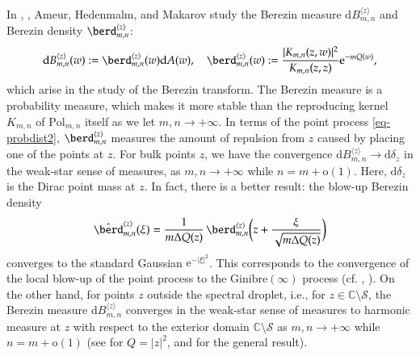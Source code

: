 \documentclass{birkart}
\theoremstyle{definition}
\theoremstyle{remark}
\numberwithin{equation}{section}
\numberwithin{figure}{section}
\newcommand{\e}{\mathrm e}
\newcommand{\1}{{\mathbf 1}}
\newcommand{\C}{{\mathbb C}}
\newcommand{\ordo}{\mathrm{o}}
\newcommand{\diff}{{\mathrm d}}
\begin{document}
In \cite{ahm1}, \cite{ahm2}, Ameur, Hedenmalm, and Makarov study 
the Berezin measure 
$\diff B_{m,n}^{\langle z\rangle}$ and Berezin density 
$\berd_{m,n}^{\langle z\rangle}$:
\[ 
\diff B_{m,n}^{\langle z\rangle}(w):=\berd_{m,n}^{\langle z\rangle}(w)
\diff A(w),\quad
 \berd_{m,n}^{\langle z\rangle}(w):= 
\frac{|K_{m,n}(z,w)|^2}{K_{m,n}(z,z)}\e^{-mQ(w)},
\]
which arise in the study of the Berezin transform. 
The Berezin measure is a probability measure, which makes it more stable than
the reproducing kernel $K_{m,n}$ of $\mathrm{Pol}_{m,n}$ itself as we let 
$m,n \to+\infty$. In terms of the point process \eqref{eq-probdist2}, 
$\berd_{m,n}^{\langle z\rangle}$ measures the amount of repulsion from $z$ 
caused by placing one of the points at $z$.  
For bulk points $z$, we have the convergence 
$\diff B^{\langle z\rangle}_{m,n}\to\diff\delta_z$ in the weak-star 
sense of measures, as $m,n\to+\infty$ while $n=m+\ordo(1)$. Here, 
$\diff\delta_z$ is the Dirac point mass at $z$. In fact, there is
a better result: the blow-up Berezin density 
\[
\hat{\berd}_{m,n}^{\langle z\rangle}(\xi)=\frac{1}{m \Delta Q(z)}\,
\berd^{\langle z\rangle}_{m,n}\bigg(z+ \frac{\xi}{\sqrt{m \Delta Q(z)}}\bigg) 
\]
converges to the standard Gaussian $\e^{-|\xi|^2}$. This corresponds to
the convergence of the local blow-up of the point process to the 
Ginibre$(\infty)$ process (cf. \cite{ahm1}, \cite{ahm2}).
On the other hand, for points $z$ outside the spectral droplet, i.e.,
for $z\in\C\setminus\mathcal{S}$, the Berezin 
measure $\diff B^{\langle z\rangle}_{m,n}$ converges in the weak-star sense 
of measures to harmonic measure at $z$ with respect to the exterior domain
$\C\setminus\mathcal{S}$ as $m,n\to+\infty$ while $n=m+\mathrm{o}(1)$
(see \cite{ahm1} for $Q=|z|^2$, and \cite{ahm2} for
the general result). 
\medskip
\end{document}

